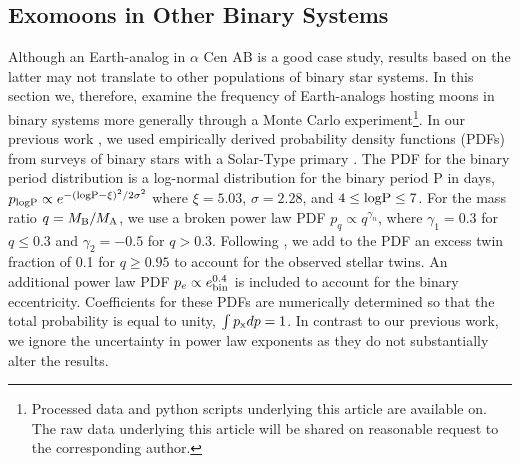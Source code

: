 \documentclass[preprint]{aastex63}
\begin{document}
\subsection{Exomoons in Other Binary Systems} \label{sec:monte_carlo}
Although an Earth-analog in $\alpha$ Cen AB is a good case study, results based on the latter may not translate to other populations of binary star systems. In this section we, therefore, examine the frequency of Earth-analogs hosting moons in binary systems more generally through a Monte Carlo experiment\footnote{Processed data and python scripts underlying this article are available on.  The raw data underlying this article will be shared on reasonable request to the corresponding author.}.  In our previous work \citep{Quarles2019,Quarles2020}, we used empirically derived probability density functions (PDFs) from surveys of binary stars with a Solar-Type primary \citep{Raghavan2010,Moe2017}.  The PDF for the binary period distribution is a log-normal distribution for the binary period P in days, $p_{\rm log P} \propto e^{-({\rm log P}-\xi)^2/2\sigma^2}$ where $\xi = 5.03$, $\sigma =2.28$, and $4\leq {\rm log P} \leq7$.  For the mass ratio $q = M_{\rm B}/M_{\rm A}$, we use a broken power law PDF $p_q \propto q^{\gamma_n}$, where $\gamma_1=0.3$ for $q\leq0.3$ and $\gamma_2=-0.5$ for $q>0.3$.  Following \cite{Moe2017}, we add to the PDF an excess twin fraction of 0.1 for $q\geq 0.95$ to account for the observed stellar twins.  An additional power law PDF $p_e \propto e_{\rm bin}^{0.4}$ is included to account for the binary eccentricity.  Coefficients for these PDFs are numerically determined so that the total probability is equal to unity, $\int p_{\rm x}dp = 1$.  In contrast to our previous work, we ignore the uncertainty in power law exponents as they do not substantially alter the results.
\end{document}
